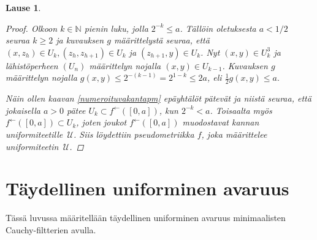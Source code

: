 \documentclass[12pt,a4paper,leqno]{report}
\newcommand{\N}{\mathbb{N}}
\newcommand{\U}{\,\mathcal{U}}
\theoremstyle{plain}
\newtheorem{lause}[equation]{Lause}
\newtheorem{kor}[equation]{Korollaari}
\theoremstyle{definition}
\theoremstyle{remark}
\begin{document}
\begin{lause}
\begin{proof}
Olkoon $k\in \N$ pienin luku, jolla $2^{-k}\leq a$. 
Tällöin oletuksesta $a<1/2$ seuraa $k\geq 2$ ja kuvauksen $g$ määrittelystä seuraa, että 
$(x,z_h)\in U_k,(z_h,z_{h+1})\in U_k$ ja $(z_{h+1},y)\in U_k$. 
Nyt 
$(x,y)\in U_k^3$ ja 
lähistöperheen $(U_n)$ määrittelyn nojalla $ (x,y)\in U_{k-1}$. 
Kuvauksen $g$ määrittelyn nojalla 
$g(x,y)\leq 2^{-(k-1)}=2^{1-k}\leq 2a$, eli $\frac{1}{2}g(x,y)\leq a.$ 

Näin ollen kaavan \ref{numeroituvakantapm} epäyhtälöt pätevät ja 
niistä seuraa, että jokaisella $a>0$ pätee 
$U_k\subset f^\leftarrow([0,a])$, kun $2^{-k}<a$. 
Toisaalta myös $f^\leftarrow([0,a])\subset U_k$, 
joten joukot $f^\leftarrow([0,a])$ muodostavat kannan uniformiteetille $\U$. 
Siis löydettiin pseudometriikka $f$, joka määrittelee uniformiteetin $\U$.
\end{proof}
\end{lause}
%
%
\chapter{Täydellinen uniforminen avaruus}
Tässä luvussa määritellään täydellinen uniforminen avaruus minimaalisten Cauchy-filtterien avulla.
\end{document}
